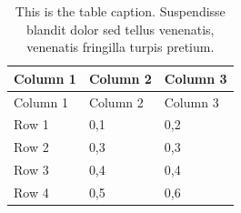 \begin{longtable}[tbp]{@{}lll@{}}
\caption[This is another short table caption]{This is the table caption. Suspendisse blandit dolor sed tellus venenatis, venenatis fringilla turpis pretium. \label{ref_a_table}}\endlastfoot
\toprule
\begin{minipage}[b]{0.25\columnwidth}\raggedright
Column 1\strut
\end{minipage} & \begin{minipage}[b]{0.3\columnwidth}\raggedright
Column 2\strut
\end{minipage} & \begin{minipage}[b]{0.25\columnwidth}\raggedright
Column 3\strut
\end{minipage}\tabularnewline
\midrule
\endfirsthead
\toprule
\begin{minipage}[b]{0.25\columnwidth}\raggedright
Column 1\strut
\end{minipage} & \begin{minipage}[b]{0.3\columnwidth}\raggedright
Column 2\strut
\end{minipage} & \begin{minipage}[b]{0.25\columnwidth}\raggedright
Column 3\strut
\end{minipage}\tabularnewline
\midrule
\endhead
\begin{minipage}[t]{0.25\columnwidth}\raggedright
Row 1\strut
\end{minipage} & \begin{minipage}[t]{0.3\columnwidth}\raggedright
0,1\strut
\end{minipage} & \begin{minipage}[t]{0.25\columnwidth}\raggedright
0,2\strut
\end{minipage}\tabularnewline\begin{minipage}[t]{0.25\columnwidth}\raggedright
Row 2\strut
\end{minipage} & \begin{minipage}[t]{0.3\columnwidth}\raggedright
0,3\strut
\end{minipage} & \begin{minipage}[t]{0.25\columnwidth}\raggedright
0,3\strut
\end{minipage}\tabularnewline\begin{minipage}[t]{0.25\columnwidth}\raggedright
Row 3\strut
\end{minipage} & \begin{minipage}[t]{0.3\columnwidth}\raggedright
0,4\strut
\end{minipage} & \begin{minipage}[t]{0.25\columnwidth}\raggedright
0,4\strut
\end{minipage}\tabularnewline\begin{minipage}[t]{0.25\columnwidth}\raggedright
Row 4\strut
\end{minipage} & \begin{minipage}[t]{0.3\columnwidth}\raggedright
0,5\strut
\end{minipage} & \begin{minipage}[t]{0.25\columnwidth}\raggedright
0,6\strut
\end{minipage}\tabularnewline
\bottomrule
\end{longtable}


